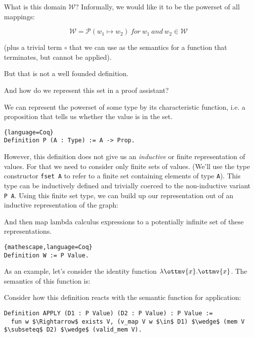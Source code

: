 \documentclass{article}
\theoremstyle{definition}
\newcommand{\codeplus}[3]{%
  }
\begin{document}
What is this domain $\mathcal{W}$? Informally, we would like it 
to be the powerset of all mappings: 

\[ \mathcal{W} = \mathscr{P}( w_1 \mapsto w_2 )\ \mathit{for}\ w_1\ \mathit{and}\ w_2 \in \mathcal{W}  \] 

\noindent
(plus a trivial term $\circ$ that we can use as the semantics for a function
that terminates, but cannot be applied).

But that is not a well founded definition. 

And how do we represent this set in a proof assistant?


We can represent the powerset of some type by its characteristic function,
i.e. a proposition that tells us whether the value is in the set.

\begin{lstlisting}{language=Coq}
Definition P (A : Type) := A -> Prop.
\end{lstlisting}

However, this definition does not give us an \emph{inductive} or finite
representation of values. For that we need to consider only finite sets of
values. (We'll use the type constructor \texttt{fset A} to refer to a finite
set containing elements of type \texttt{A}). This type can be inductively
defined and trivially coerced to the non-inductive variant \texttt{P A}. Using
this finite set type, we can build up our representation out of an inductive
representation of the graph:

\codeplus{../coq/simple/model.v}{Value}{language=Coq}

And then map lambda calculus expressions to a potentially infinite set of these representations.

\begin{lstlisting}{mathescape,language=Coq}
Definition W := P Value.
\end{lstlisting}

As an example, let's consider the identity function $ \lambda  \ottmv{x}  .  \ottmv{x} $. The 
semantics of this function is:



Consider how this definition reacts with the semantic function for application:

\begin{lstlisting}[language=Coq,mathescape]
Definition APPLY (D1 : P Value) (D2 : P Value) : P Value :=
  fun w $\Rightarrow$ exists V, (v_map V w $\in$ D1) $\wedge$ (mem V $\subseteq$ D2) $\wedge$ (valid_mem V).
\end{lstlisting}
\end{document}
